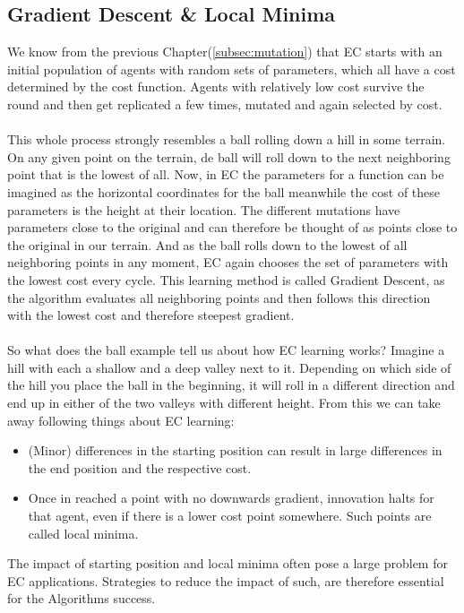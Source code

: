 \documentclass[11pt]{report}
\begin{document}
            \subsection{Gradient Descent \& Local Minima}\label{subsec:gradient-descent}
    We know from the previous Chapter(\ref{subsec:mutation}) that EC starts with an initial population of agents with random sets of parameters, which all have a cost determined by the cost function.
    Agents with relatively low cost survive the round and then get replicated a few times, mutated and again selected by cost.
    \\ \\
    This whole process strongly resembles a ball rolling down a hill in some terrain.
    On any given point on the terrain, de ball will roll down to the next neighboring point that is the lowest of all.
    Now, in EC the parameters for a function can be imagined as the horizontal coordinates for the ball meanwhile the cost of these parameters is the height at their location.
    The different mutations have parameters close to the original and can therefore be thought of as points close to the original in our terrain.
    And as the ball rolls down to the lowest of all neighboring points in any moment, EC again chooses the set of parameters with the lowest cost every cycle.
    This learning method is called Gradient Descent, as the algorithm evaluates all neighboring points and then follows this direction with the lowest cost and therefore steepest gradient.
    \\ \\
    So what does the ball example tell us about how EC learning works?
    Imagine a hill with each a shallow and a deep valley next to it.
    Depending on which side of the hill you place the ball in the beginning, it will roll in a different direction and end up in either of the two valleys with different height.
    From this we can take away following things about EC learning:
    \begin{itemize}
        \item (Minor) differences in the starting position can result in large differences in the end position and the respective cost.
        \item Once in reached a point with no downwards gradient, innovation halts for that agent, even if there is a lower cost point somewhere.
        Such points are called local minima.
    \end{itemize}
    The impact of starting position and local minima often pose a large problem for EC applications.
    Strategies to reduce the impact of such, are therefore essential for the Algorithms success.
\end{document}
